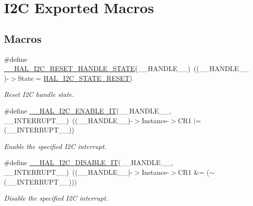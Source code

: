 \hypertarget{group___i2_c___exported___macros}{}\section{I2C Exported Macros}
\label{group___i2_c___exported___macros}
\subsection*{Macros}
\begin{DoxyCompactItemize}
\item 
\#define \mbox{\hyperlink{group___i2_c___exported___macros_ga74c8fd72a78882720c28448ce8bd33d8}{\+\_\+\+\_\+\+H\+A\+L\+\_\+\+I2\+C\+\_\+\+R\+E\+S\+E\+T\+\_\+\+H\+A\+N\+D\+L\+E\+\_\+\+S\+T\+A\+TE}}(\+\_\+\+\_\+\+H\+A\+N\+D\+L\+E\+\_\+\+\_\+)~((\+\_\+\+\_\+\+H\+A\+N\+D\+L\+E\+\_\+\+\_\+)-\/$>$State = \mbox{\hyperlink{group___h_a_l__state__structure__definition_ggaef355af8eab251ae2a19ee164ad81c37a91ba08634e08d7287940f1bc5a37eeff}{H\+A\+L\+\_\+\+I2\+C\+\_\+\+S\+T\+A\+T\+E\+\_\+\+R\+E\+S\+ET}})
\begin{DoxyCompactList}\small\item\em Reset I2C handle state. \end{DoxyCompactList}\item 
\#define \mbox{\hyperlink{group___i2_c___exported___macros_gac9d8b249b06b2d30f987acc9ceebd1d9}{\+\_\+\+\_\+\+H\+A\+L\+\_\+\+I2\+C\+\_\+\+E\+N\+A\+B\+L\+E\+\_\+\+IT}}(\+\_\+\+\_\+\+H\+A\+N\+D\+L\+E\+\_\+\+\_\+,  \+\_\+\+\_\+\+I\+N\+T\+E\+R\+R\+U\+P\+T\+\_\+\+\_\+)~((\+\_\+\+\_\+\+H\+A\+N\+D\+L\+E\+\_\+\+\_\+)-\/$>$Instance-\/$>$C\+R1 $\vert$= (\+\_\+\+\_\+\+I\+N\+T\+E\+R\+R\+U\+P\+T\+\_\+\+\_\+))
\begin{DoxyCompactList}\small\item\em Enable the specified I2C interrupt. \end{DoxyCompactList}\item 
\#define \mbox{\hyperlink{group___i2_c___exported___macros_ga33d0c7202ae298fa3ae128c5da49d455}{\+\_\+\+\_\+\+H\+A\+L\+\_\+\+I2\+C\+\_\+\+D\+I\+S\+A\+B\+L\+E\+\_\+\+IT}}(\+\_\+\+\_\+\+H\+A\+N\+D\+L\+E\+\_\+\+\_\+,  \+\_\+\+\_\+\+I\+N\+T\+E\+R\+R\+U\+P\+T\+\_\+\+\_\+)~((\+\_\+\+\_\+\+H\+A\+N\+D\+L\+E\+\_\+\+\_\+)-\/$>$Instance-\/$>$C\+R1 \&= ($\sim$(\+\_\+\+\_\+\+I\+N\+T\+E\+R\+R\+U\+P\+T\+\_\+\+\_\+)))
\begin{DoxyCompactList}\small\item\em Disable the specified I2C interrupt. \end{DoxyCompactList}\item 

\end{DoxyCompactItemize}
